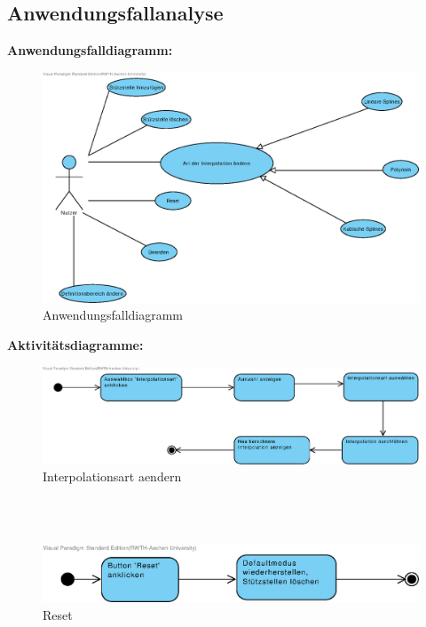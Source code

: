 \subsection{Anwendungsfallanalyse}

\textbf{Anwendungsfalldiagramm:}

\begin{figure}[H]
\centering
\includegraphics[width=\textwidth]{Aktivitaetsdiagramm/Top_Level_Use_Cases}
\caption{Anwendungsfalldiagramm}
\label{fig:Anwendungsfalldiagramm}
\end{figure}

\textbf{Aktivit\"atsdiagramme:}



\begin{figure}[H]
\centering
\includegraphics[width=\textwidth]{Aktivitaetsdiagramm/interpolationAuswaehlen.eps}
\caption{Interpolationsart aendern}
\label{fig:Interpolationsart aendern}
\end{figure}

\hfill \\
\hfill \\
  
\begin{figure}[H]
\centering
\includegraphics[width=\textwidth]{Aktivitaetsdiagramm/Reset.eps}
\caption{Reset}
\label{fig:Reset}
\end{figure}

